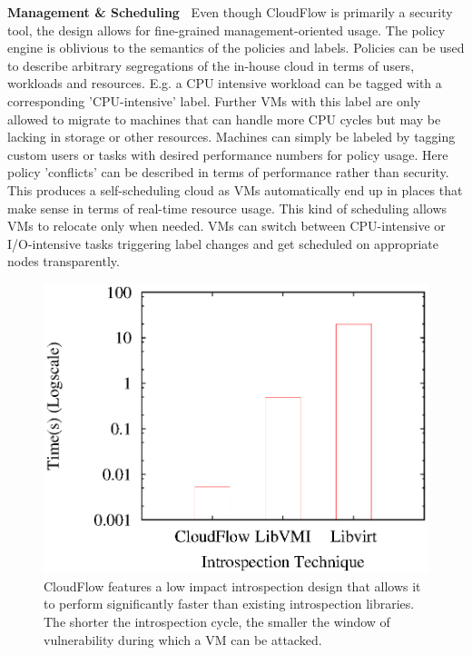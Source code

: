 \noindent
{\bf Management \& Scheduling~}
%
Even though CloudFlow is primarily a security tool, the design allows for fine-grained management-oriented usage. The policy engine is oblivious to the semantics of the policies and labels. Policies can be used to describe arbitrary segregations of the in-house cloud in terms of users, workloads and resources. E.g. a CPU intensive workload can be tagged with a corresponding 'CPU-intensive' label. Further VMs with this label are only allowed to migrate to machines that can handle more CPU cycles but may be lacking in storage or other resources. Machines can simply be labeled by tagging custom users or tasks with desired performance numbers for policy usage. Here policy 'conflicts' can be described in terms of performance rather than security. This produces a self-scheduling cloud as VMs automatically end up in places that make sense in terms of real-time resource usage. This kind of scheduling allows VMs to relocate only when needed. VMs can switch between CPU-intensive or I/O-intensive tasks triggering label changes and get scheduled on appropriate nodes transparently.

\begin{figure}[t]
\begin{center}
\includegraphics[scale=0.6]{figures/introspectionwindow.eps}
\caption{\small 
%
CloudFlow features a low impact introspection design that allows it to
perform significantly faster than existing introspection libraries.  The
shorter the introspection cycle, the smaller the window of vulnerability
during which a VM can be attacked.
% 
\label{cloudflow:figure:introspectionwindow}}
\end{center}
\end{figure}

